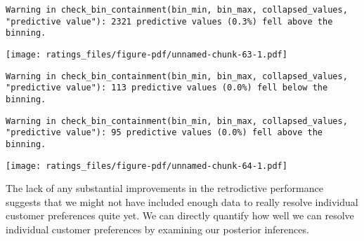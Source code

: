 \documentclass[
  letterpaper,
  DIV=11,
  numbers=noendperiod]{scrartcl}
\newenvironment{Shaded}{\begin{snugshade}}{\end{snugshade}}
\newcommand{\AttributeTok}[1]{\textcolor[rgb]{0.40,0.45,0.13}{#1}}
\newcommand{\DecValTok}[1]{\textcolor[rgb]{0.68,0.00,0.00}{#1}}
\newcommand{\FloatTok}[1]{\textcolor[rgb]{0.68,0.00,0.00}{#1}}
\newcommand{\FunctionTok}[1]{\textcolor[rgb]{0.28,0.35,0.67}{#1}}
\newcommand{\NormalTok}[1]{\textcolor[rgb]{0.00,0.23,0.31}{#1}}
\newcommand{\OtherTok}[1]{\textcolor[rgb]{0.00,0.23,0.31}{#1}}
\newcommand{\SpecialCharTok}[1]{\textcolor[rgb]{0.37,0.37,0.37}{#1}}
\newcommand{\StringTok}[1]{\textcolor[rgb]{0.13,0.47,0.30}{#1}}
\begin{document}
\begin{verbatim}
Warning in check_bin_containment(bin_min, bin_max, collapsed_values,
"predictive value"): 2321 predictive values (0.3%) fell above the binning.
\end{verbatim}

\texttt{[image: ratings\_files/figure-pdf/unnamed-chunk-63-1.pdf]}

\begin{Shaded}
\end{Shaded}

\begin{verbatim}
Warning in check_bin_containment(bin_min, bin_max, collapsed_values,
"predictive value"): 113 predictive values (0.0%) fell below the binning.
\end{verbatim}

\begin{verbatim}
Warning in check_bin_containment(bin_min, bin_max, collapsed_values,
"predictive value"): 95 predictive values (0.0%) fell above the binning.
\end{verbatim}

\texttt{[image: ratings\_files/figure-pdf/unnamed-chunk-64-1.pdf]}

The lack of any substantial improvements in the retrodictive performance
suggests that we might not have included enough data to really resolve
individual customer preferences quite yet. We can directly quantify how
well we can resolve individual customer preferences by examining our
posterior inferences.
\end{document}
